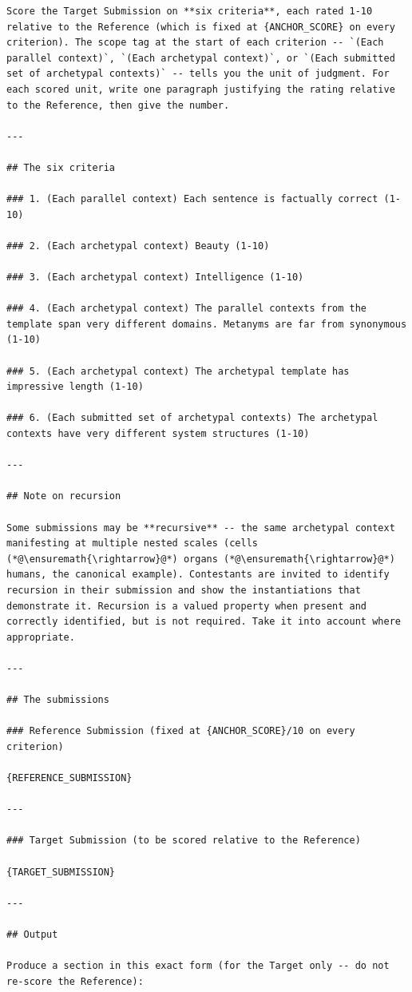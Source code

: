 \documentclass{article}
\begin{document}
\begin{lstlisting}
Score the Target Submission on **six criteria**, each rated 1-10 relative to the Reference (which is fixed at {ANCHOR_SCORE} on every criterion). The scope tag at the start of each criterion -- `(Each parallel context)`, `(Each archetypal context)`, or `(Each submitted set of archetypal contexts)` -- tells you the unit of judgment. For each scored unit, write one paragraph justifying the rating relative to the Reference, then give the number.

---

## The six criteria

### 1. (Each parallel context) Each sentence is factually correct (1-10)

### 2. (Each archetypal context) Beauty (1-10)

### 3. (Each archetypal context) Intelligence (1-10)

### 4. (Each archetypal context) The parallel contexts from the template span very different domains. Metanyms are far from synonymous (1-10)

### 5. (Each archetypal context) The archetypal template has impressive length (1-10)

### 6. (Each submitted set of archetypal contexts) The archetypal contexts have very different system structures (1-10)

---

## Note on recursion

Some submissions may be **recursive** -- the same archetypal context manifesting at multiple nested scales (cells (*@\ensuremath{\rightarrow}@*) organs (*@\ensuremath{\rightarrow}@*) humans, the canonical example). Contestants are invited to identify recursion in their submission and show the instantiations that demonstrate it. Recursion is a valued property when present and correctly identified, but is not required. Take it into account where appropriate.

---

## The submissions

### Reference Submission (fixed at {ANCHOR_SCORE}/10 on every criterion)

{REFERENCE_SUBMISSION}

---

### Target Submission (to be scored relative to the Reference)

{TARGET_SUBMISSION}

---

## Output

Produce a section in this exact form (for the Target only -- do not re-score the Reference):


\end{lstlisting}
\end{document}
